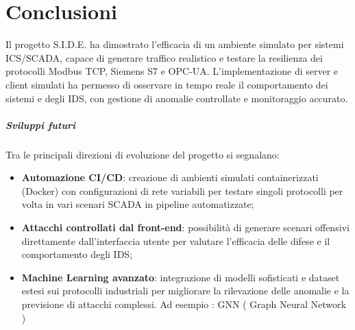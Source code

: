 \chapter{Conclusioni}

Il progetto S.I.D.E. ha dimostrato l’efficacia di un ambiente simulato per sistemi ICS/SCADA, capace di generare traffico realistico e testare la resilienza dei protocolli Modbus TCP, Siemens S7 e OPC-UA. L’implementazione di server e client simulati ha permesso di osservare in tempo reale il comportamento dei sistemi e degli IDS, con gestione di anomalie controllate e monitoraggio accurato.

\paragraph{Sviluppi futuri}
Tra le principali direzioni di evoluzione del progetto si segnalano:
\begin{itemize}
\item \textbf{Automazione CI/CD}: creazione di ambienti simulati containerizzati (Docker) con configurazioni di rete variabili per testare singoli protocolli per volta in vari scenari SCADA in pipeline automatizzate;
\item \textbf{Attacchi controllati dal front-end}: possibilità di generare scenari offensivi direttamente dall’interfaccia utente per valutare l’efficacia delle difese e il comportamento degli IDS;
\item \textbf{Machine Learning avanzato}: integrazione di modelli sofisticati e dataset estesi sui protocolli industriali per migliorare la rilevazione delle anomalie e la previsione di attacchi complessi. Ad esempio : GNN ( Graph Neural Network ) 
\end{itemize}